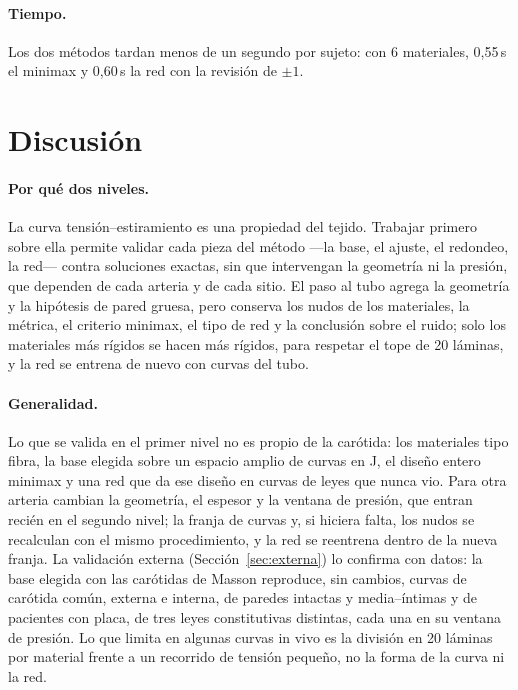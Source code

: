 \paragraph{Tiempo.} Los dos métodos tardan menos de un segundo por sujeto: con 6 materiales, 0,55\,s el minimax y 0,60\,s la red con la revisión de $\pm1$.

\section{Discusión}
\paragraph{Por qué dos niveles.} La curva tensión--estiramiento es una propiedad del tejido. Trabajar primero sobre ella permite validar cada pieza del método ---la base, el ajuste, el redondeo, la red--- contra soluciones exactas, sin que intervengan la geometría ni la presión, que dependen de cada arteria y de cada sitio. El paso al tubo agrega la geometría y la hipótesis de pared gruesa, pero conserva los nudos de los materiales, la métrica, el criterio minimax, el tipo de red y la conclusión sobre el ruido; solo los materiales más rígidos se hacen más rígidos, para respetar el tope de 20 láminas, y la red se entrena de nuevo con curvas del tubo.

\paragraph{Generalidad.} Lo que se valida en el primer nivel no es propio de la carótida: los materiales tipo fibra, la base elegida sobre un espacio amplio de curvas en J, el diseño entero minimax y una red que da ese diseño en curvas de leyes que nunca vio. Para otra arteria cambian la geometría, el espesor y la ventana de presión, que entran recién en el segundo nivel; la franja de curvas y, si hiciera falta, los nudos se recalculan con el mismo procedimiento, y la red se reentrena dentro de la nueva franja. La validación externa (Sección~\ref{sec:externa}) lo confirma con datos: la base elegida con las carótidas de Masson reproduce, sin cambios, curvas de carótida común, externa e interna, de paredes intactas y media--íntimas y de pacientes con placa, de tres leyes constitutivas distintas, cada una en su ventana de presión. Lo que limita en algunas curvas in vivo es la división en 20 láminas por material frente a un recorrido de tensión pequeño, no la forma de la curva ni la red.

